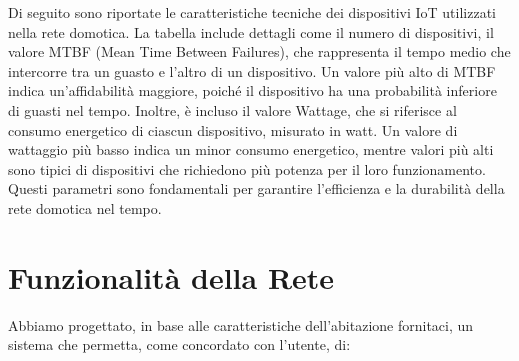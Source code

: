 \documentclass[italian, 12pt, a4paper]{article}
\begin{document}
\clearpage
Di seguito sono riportate le caratteristiche tecniche dei dispositivi IoT utilizzati nella rete domotica. La tabella include dettagli come il numero di dispositivi, il valore MTBF (Mean Time Between Failures), che rappresenta il tempo medio che intercorre tra un guasto e l'altro di un dispositivo. Un valore più alto di MTBF indica un'affidabilità maggiore, poiché il dispositivo ha una probabilità inferiore di guasti nel tempo. Inoltre, è incluso il valore Wattage, che si riferisce al consumo energetico di ciascun dispositivo, misurato in watt. Un valore di wattaggio più basso indica un minor consumo energetico, mentre valori più alti sono tipici di dispositivi che richiedono più potenza per il loro funzionamento. Questi parametri sono fondamentali per garantire l'efficienza e la durabilità della rete domotica nel tempo.
\begin{center}
    \renewcommand{\arraystretch}{1.5}
\end{center}
\clearpage
\section{Funzionalità della Rete}\label{sec:progettazione}
Abbiamo progettato, in base alle caratteristiche dell'abitazione fornitaci, un sistema  che permetta, come concordato con l’utente, di: 
\end{document}
